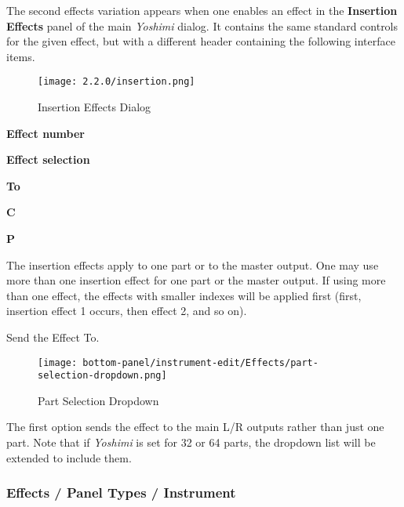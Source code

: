    The second effects variation
   appears when one enables an effect in the
   \textbf{Insertion Effects}
   panel of the main \textsl{Yoshimi} dialog.
   It contains the same standard controls for the given effect, but with
   a different header containing the following interface items.

\begin{figure}[H]
   \centering
   \texttt{[image: 2.2.0/insertion.png]}
   \caption{Insertion Effects Dialog}
   \label{fig:insertion_effects_dialog}
\end{figure}

   \begin{enumber}
      \item \textbf{Effect number}
      \item \textbf{Effect selection}
      \item \textbf{To}
      \item \textbf{C}
      \item \textbf{P}
   \end{enumber}

   The insertion effects apply to one part or to the master output.
   One may use more    than one insertion effect for one part or the
   master output. If using more than one effect, the effects with smaller
   indexes will be applied first (first, insertion effect 1 occurs, then
   effect 2, and so on).

   \setcounter{ItemCounter}{0}     %

   Send the Effect To.

\begin{figure}[H]
   \centering
   \texttt{[image: bottom-panel/instrument-edit/Effects/part-selection-dropdown.png]}
   \caption{Part Selection Dropdown}
   \label{fig:sample_part_selection_dropdown}
\end{figure}
   The first option sends the effect to the main L/R outputs rather than
   just one part.
   Note that if \textsl{Yoshimi} is set for 32 or 64 parts, the dropdown list
   will be extended to include them.

\subsubsection{Effects / Panel Types / Instrument }
\label{subsubsec:effects_paneltypes_instrument}

